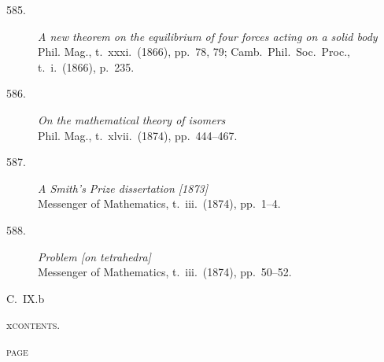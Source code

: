 \documentclass[11pt]{article}
\begin{document}
\begin{description}
\item[585.] \textit{A new theorem on the equilibrium of four forces acting on a solid body}\\
\hspace*{1em}\small Phil. Mag., t.~xxxi.\ (1866), pp.~78, 79; Camb.\ Phil.\ Soc.\ Proc., t.~i.\ (1866), p.~235.

\item[586.] \textit{On the mathematical theory of isomers}\\
\hspace*{1em}\small Phil. Mag., t.~xlvii.\ (1874), pp.~444--467.

\item[587.] \textit{A Smith's Prize dissertation [1873]}\\
\hspace*{1em}\small Messenger of Mathematics, t.~iii.\ (1874), pp.~1--4.

\item[588.] \textit{Problem [on tetrahedra]}\\
\hspace*{1em}\small Messenger of Mathematics, t.~iii.\ (1874), pp.~50--52.
\end{description}

\vspace{1em}
\noindent\small C.~IX.\hfill b
\newpage

\thispagestyle{empty}
\noindent\small x\hfill\textsc{contents.}
\vspace*{1em}

\noindent\hfill\textsc{page}

\medskip
\end{document}
